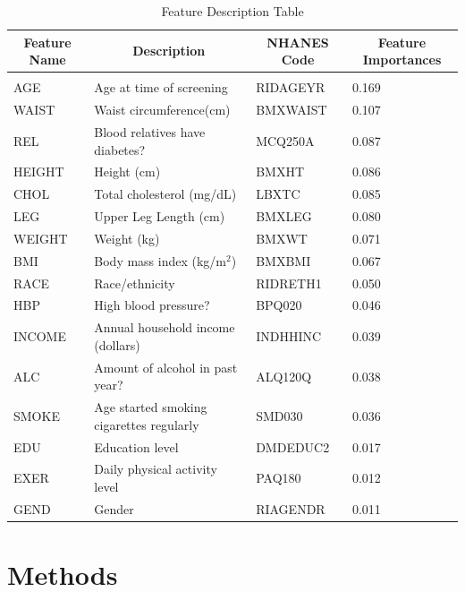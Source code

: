 \documentclass{article} %
\begin{document}
\begin{table}[h!]
\caption{Feature Description Table}
\begin{center}
\begin{tabular}{llll}
\multicolumn{1}{c}{\bf Feature Name}  &\multicolumn{1}{c}{\bf Description} &\multicolumn{1}{c}{\bf NHANES Code} &\multicolumn{1}{c}{\bf Feature Importances}
\\ \hline \\
AGE        &Age at time of screening & RIDAGEYR & 0.169\\
WAIST      &Waist circumference(cm) & BMXWAIST & 0.107\\
REL        &Blood relatives have diabetes? & MCQ250A & 0.087\\
HEIGHT     &Height (cm) & BMXHT & 0.086\\
CHOL       &Total cholesterol (mg/dL) & LBXTC & 0.085\\
LEG        &Upper Leg Length (cm) & BMXLEG & 0.080\\
WEIGHT     &Weight (kg) & BMXWT & 0.071\\
BMI        &Body mass index (kg/m$^2$) & BMXBMI & 0.067\\
RACE       &Race/ethnicity & RIDRETH1 & 0.050\\
HBP        &High blood pressure? & BPQ020 & 0.046\\
INCOME     &Annual household income (dollars) & INDHHINC & 0.039\\
ALC        &Amount of alcohol in past year? & ALQ120Q & 0.038\\
SMOKE      &Age started smoking cigarettes regularly & SMD030 & 0.036\\
EDU        &Education level & DMDEDUC2 & 0.017\\
EXER       &Daily physical activity level & PAQ180 & 0.012\\
GEND       &Gender & RIAGENDR & 0.011
\end{tabular}
\end{center}
\label{feature-table}
\end{table}

\section{Methods}
\end{document}
